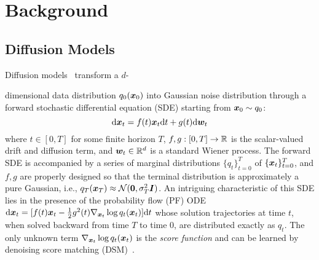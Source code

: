 \section{Background}
\subsection{Diffusion Models}
Diffusion models~\citep{song2020score,sohl2015deep,ho2020denoising} transform a $d$-

dimensional data distribution $q_0(\bm{x}_0)$ into Gaussian noise distribution through a forward stochastic differential equation (SDE) starting from $\bm{x}_0\sim q_0$:
\begin{equation}
    \label{eq:forwardSDE}
    \mathrm{d} \bm{x}_t = f(t)\bm{x}_t \mathrm{d} t + g(t)\mathrm{d}\bm{w}_t
\end{equation}
where $t \in [0, T]$ for some finite horizon $T$, $f,g:[0,T] \to \mathbb{R}$ is the scalar-valued drift and diffusion term, and $\bm{w}_t \in \mathbb{R}^d$ is a standard Wiener process. The forward SDE is accompanied by a series of marginal distributions $\{q_t\}_{t=0}^T$ of $\{\bm{x}_t\}_{t=0}^T$, and $f,g$ are properly designed so that the terminal distribution is approximately a pure Gaussian, i.e., $q_T(\boldsymbol{x}_T)\approx \mathcal N(\bm{0},\sigma_T^2\bm{I})$. An intriguing characteristic of this SDE lies in the presence of the probability flow (PF) ODE~\citep{song2020score}
$
    \mathrm{d}\bm{x}_t = [f(t)\bm{x}_t - \frac{1}{2}g^2(t)\nabla_{\bm{x}_t} \log q_t(\bm{x}_t)] \mathrm{d} t
$
whose solution trajectories at time $t$, when solved backward from time $T$ to time $0$, are distributed exactly as $q_t$. The only unknown term $\nabla_{\bm{x}_t}\log q_t(\bm{x}_t)$ is the \textit{score function} and can be learned by denoising score matching (DSM)~\citep{vincent2011connection}.

